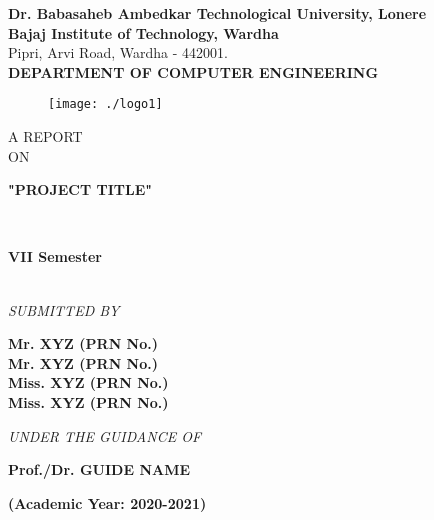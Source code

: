 \documentclass[a4paper, 12pt]{report}
\begin{document}
\newenvironment{frontmatter}{}{}
\begin{frontmatter}
\begin{titlepage}
\begin{center}
\textup{\large  \textbf{Dr. Babasaheb Ambedkar Technological University, Lonere}\\\textbf{Bajaj Institute of Technology, Wardha}}\\Pipri, Arvi Road, Wardha - 442001.\\[0.5cm]\textbf{\large DEPARTMENT OF COMPUTER ENGINEERING}


\begin{center}
\begin{figure}[h]  %
\centering
\texttt{[image: ./logo1]}
\end{figure}
\end{center}

\textup{\large  A REPORT\\[0.4cm]ON}\\[0.4cm]
\begin{LARGE}
{\textbf {"PROJECT TITLE" }}\end{LARGE}\\[1cm]
\begin{large}\textbf {VII Semester}
\end{large}\\[0.5cm]
\textit{SUBMITTED BY}\\[0.3cm]
\begin{large}
\textbf{Mr. XYZ (PRN No.)}\\[0.1cm]
\textbf{Mr. XYZ (PRN No.)}\\[0.1cm]
\textbf{Miss. XYZ (PRN No.)}\\[0.1cm]
\textbf{Miss. XYZ (PRN No.)}\\[0.5cm]
\end{large}
\textit{UNDER THE GUIDANCE OF}\\[0.7cm]
\begin{large}\textbf{Prof./Dr. GUIDE NAME}\\[0.3cm]\end{large}
\textbf{(Academic Year: 2020-2021)}
\vfill
\end{center}
\end{titlepage}


\end{frontmatter}
\end{document}
